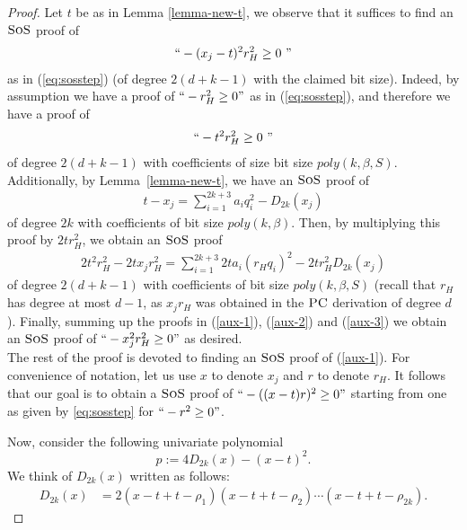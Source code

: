 \documentclass[11pt]{article}
\newcommand{\sos}{\text{\sc{SoS}}}
\newcommand{\PC}{\textsc{PC}}
\newcommand{\1}{\textbf{1}}
\begin{document}
\begin{proof}
Let $t$ be as in Lemma \ref{lemma-new-t}, we observe that it suffices to find an $\sos$ proof of 
\begin{align}\label{aux-1}
``-(x_j-t)^2r_H^2 \geq 0 \ "
\end{align}
as in (\ref{eq:sosstep}) (of degree $2(d+k-1)$ with the claimed bit size). Indeed, by assumption we have a proof of $``-r_H^2\geq 0"$ as in (\ref{eq:sosstep}), and therefore we have a proof of 
\begin{align}\label{aux-2}
``-t^2r_H^2\geq 0 \ "
\end{align}
of degree $2(d+k-1)$ with coefficients of size bit size $poly(k,\beta,S)$. Additionally, by Lemma~\ref{lemma-new-t}, we have an $\sos$ proof of 
\begin{align}
    t - x_j = \sum_{i=1}^{2k+3}a_iq_i^2 - D_{2k}(x_j) 
\end{align}
of degree $2k$ with coefficients of bit size $poly(k,\beta)$. Then, by multiplying this proof by $2t r_H^2$, we obtain an $\sos$ proof 
\begin{align} \label{aux-3} 
   2t^2r_H^2- 2t x_j r_H^2  = \sum_{i=1}^{2k+3}2ta_i(r_Hq_i)^2  - 2tr_H^2D_{2k}(x_j)  
\end{align}
of degree $2(d+k-1)$ with coefficients of bit size $poly(k,\beta, S)$ (recall that $r_H$ has degree at most $d-1$, as $x_jr_H$ was obtained in the $\PC$ derivation of degree $d$). Finally, summing up the proofs in (\ref{aux-1}), (\ref{aux-2}) and (\ref{aux-3}) we obtain an $\sos$ proof of $``-x_j^2r_H^2\geq0"$ as desired.
\\

The rest of the proof is devoted to finding an $\sos$ proof of (\ref{aux-1}). For convenience of notation, let us  use $x$ to denote $x_j$ and $r$ to denote $r_{H}$.    
It follows that our goal is to obtain a $\sos$ proof of $``-((x-t)r)^2\geq 0"$ starting from one as given by \eqref{eq:sosstep} for $``-r^2\geq 0"$. 

Now, consider the following univariate polynomial 
$$p:= 4D_{2k}(x) - (x-t)^2.$$
We think of $D_{2k}(x)$ written as follows:
\begin{align}
D_{2k}(x)&=2(x-t+t-\rho_{1})(x-t+t-\rho_{2})\cdots (x-t+t-\rho_{2k}).     \label{eq:domain_f_rootsM}
\end{align}



\end{proof}
\end{document}
